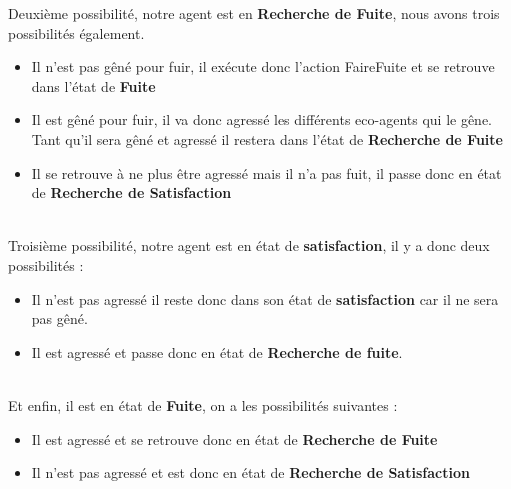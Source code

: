            Deuxième possibilité, notre agent est en \textbf{Recherche de Fuite}, nous avons trois possibilités également. \\
            \begin{itemize}
                \item Il n'est pas gêné pour fuir, il exécute donc l'action FaireFuite et se retrouve dans l'état de \textbf{Fuite}
                \item Il est gêné pour fuir, il va donc agressé les différents eco-agents qui le gêne. Tant qu'il sera gêné et agressé il restera dans l'état de \textbf{Recherche de Fuite}
                \item Il se retrouve à ne plus être agressé mais il n'a pas fuit, il passe donc en état de \textbf{Recherche de Satisfaction} 
            \end{itemize}~\\

            Troisième possibilité, notre agent est en état de \textbf{satisfaction}, il y a donc deux possibilités :\\
            \begin{itemize}
                \item Il n'est pas agressé il reste donc dans son état de \textbf{satisfaction} car il ne sera pas gêné.
                \item Il est agressé et passe donc en état de \textbf{Recherche de fuite}. 
            \end{itemize}~\\

            Et enfin, il est en état de \textbf{Fuite}, on a les possibilités suivantes :\\
            \begin{itemize}
                \item Il est agressé et se retrouve donc en état de \textbf{Recherche de Fuite}
                \item Il n'est pas agressé et est donc en état de \textbf{Recherche de Satisfaction}
        \end{itemize}
